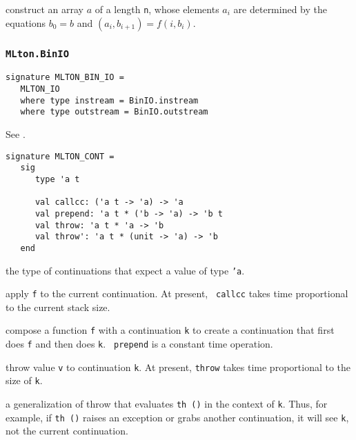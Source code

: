 \begin{description}

construct an array $a$ of a length {\tt n}, whose elements $a_i$ are determined
by the equations $b_0 = b$ and $(a_i, b_{i+1}) = f (i, b_i)$.

\end{description}

\subsubsection{{\tt MLton.BinIO}}
\begin{verbatim}
signature MLTON_BIN_IO =
   MLTON_IO
   where type instream = BinIO.instream
   where type outstream = BinIO.outstream
\end{verbatim}

See .


\begin{verbatim}
signature MLTON_CONT =
   sig
      type 'a t

      val callcc: ('a t -> 'a) -> 'a
      val prepend: 'a t * ('b -> 'a) -> 'b t
      val throw: 'a t * 'a -> 'b
      val throw': 'a t * (unit -> 'a) -> 'b
   end
\end{verbatim}

\begin{description}

the type of continuations that expect a value of type {\tt 'a}.

apply {\tt f} to the current continuation.  At present, {\tt
callcc} takes time proportional to the current stack size.

compose a function {\tt f} with a continuation {\tt k} to create a
continuation that first does {\tt f} and then does {\tt k}.  {\tt
prepend} is a constant time operation.

throw value {\tt v} to continuation {\tt k}.  At present, {\tt throw}
takes time proportional to the size of {\tt k}.

a generalization of throw that evaluates {\tt th ()} in the context
of {\tt k}.  Thus, for example, if {\tt th ()} raises an exception or
grabs another continuation, it will see {\tt k}, not the current
continuation.

\end{description}

